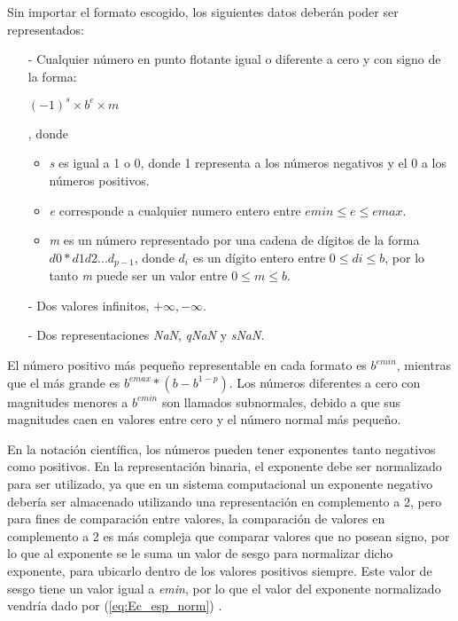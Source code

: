 Sin importar el formato escogido, los siguientes datos deberán poder ser representados:

\begin{itemize}
	\item[-]	Cualquier número en punto flotante igual o diferente a cero y con signo de la forma:
	\begin{center} $(-1)^{s} \times b^{e} \times m $ \end{center}, donde
	\begin{itemize}
		\item	\textit{s} es igual a 1 o 0, donde 1 representa a los números negativos y el 0 a los números positivos.
		\item	\textit{e} corresponde a cualquier numero entero entre $emin \leq e \leq emax$.
		\item	\textit{m} es un número representado por una cadena de dígitos de la forma $ d0*d1d2...d_{p-1} $, donde $ d_{i} $ es un dígito entero entre $ 0 \leq di \leq b $, por lo tanto \textit{m} puede ser un valor  entre $ 0 \leq m \leq b $.
		
	\end{itemize}
	\item[-]	Dos valores infinitos, $ +\infty,-\infty $.
	\item[-]	Dos representaciones \textit{NaN}, \textit{qNaN} y \textit{sNaN}.
\end{itemize}

El número positivo más pequeño representable en cada formato es $b^{emin}$, mientras que el más grande es $b^{emax}*(b-b^{1-p})$. Los números diferentes a cero con magnitudes menores a $b^{emin}$ son llamados subnormales, debido a que sus magnitudes caen en valores entre cero y el número normal más pequeño.

En la notación científica, los números pueden tener exponentes tanto negativos como positivos. En la representación binaria, el exponente debe ser  normalizado para ser utilizado, ya que en un sistema computacional un exponente negativo debería ser almacenado utilizando una representación en complemento a 2, pero para fines de comparación entre valores, la comparación de valores en complemento a 2 es más compleja que comparar valores que no posean signo, por lo que al exponente se le suma un valor de sesgo para normalizar dicho exponente, para ubicarlo dentro de los valores positivos siempre. Este valor de sesgo tiene un valor igual a \textit{emin}, por lo que el valor del exponente normalizado vendría dado por (\ref{eq:Ec_esp_norm})  \cite{Tesis_Diego}.

